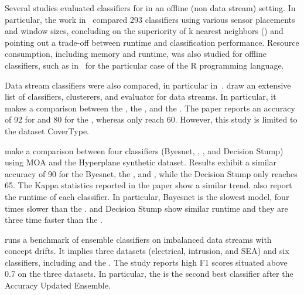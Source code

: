 
Several studies evaluated classifiers for \har in an offline (non data stream)
setting. In particular, the work in~\cite{Janidarmian_2017} compared 293
classifiers using various sensor placements and window sizes, concluding on the
superiority of k nearest neighbors (\knn) and pointing out a trade-off between
runtime and classification performance. Resource consumption, including memory
and runtime, was also studied for offline classifiers, such as
in~\cite{memory_consumption_machine_learning} for the particular case of the R
programming language.

Data stream classifiers were also compared, in particular
in~\cite{prasad2016stream, kaur2020,priya2020comprehensive, StreamDM-CPP}.
\cite{prasad2016stream} draw an extensive list of classifiers, clusterers, and
evaluator for data streams. In particular, it makes a comparison between the
\hoeffdingtree, the \naivebayes, and the \knn. The paper reports an accuracy of
92 for \knn and 80 for the \hoeffdingtree, whereas \naivebayes only reach 60.
However, this study is limited to the dataset CoverType.

\cite{kaur2020} make a comparison between four classifiers (Byesnet,
\hoeffdingtree, \naivebayes, and Decision Stump) using MOA and the Hyperplane
synthetic dataset. Results exhibit a similar accuracy of 90 for the Byesnet, the
\hoeffdingtree, and \naivebayes, while the Decision Stump only reaches 65.  The
Kappa statistics reported in the paper show a similar trend.  \cite{kaur2020}
also report the runtime of each classifier. In particular, Bayesnet is the
slowest model, four times slower than the \hoeffdingtree.  \naivebayes and
Decision Stump show similar runtime and they are three time faster than the
\hoeffdingtree.

\cite{priya2020comprehensive} runs a benchmark of ensemble classifiers on
imbalanced data streams with concept drifts.  It implies three datasets
(electrical, intrusion, and SEA) and six classifiers, including \naivebayes and
the \hoeffdingtree. The study reports high F1 scores situated above 0.7 on the
three datasets. In particular, the \hoeffdingtree is the second best classifier
after the Accuracy Updated Ensemble.

